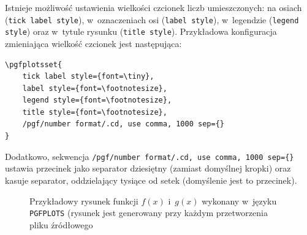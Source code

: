 Istnieje możliwość ustawienia wielkości czcionek liczb umieszczonych: na osiach (\verb+tick label style+), w~oznaczeniach osi (\verb+label style+), w~legendzie (\verb+legend style+) oraz w~tytule rysunku (\verb+title style+). Przykładowa konfiguracja zmieniająca wielkość czcionek jest następująca:
\begin{lstlisting}[style=customlatex,frame=single]
\pgfplotsset{
	tick label style={font=\tiny},
	label style={font=\footnotesize},
	legend style={font=\footnotesize},
	title style={font=\footnotesize},
	/pgf/number format/.cd, use comma, 1000 sep={}
}
\end{lstlisting}
Dodatkowo, sekwencja \verb+/pgf/number format/.cd, use comma, 1000 sep={}+ ustawia przecinek jako separator dziesiętny (zamiast domyślnej kropki) oraz kasuje separator, oddzielający tysiące od setek (domyślenie jest to przecinek).

\newcommand{\szer}{8cm}
\newcommand{\wys}{7cm}

\begin{figure}[tb]
\centering
{}
\caption{Przykładowy rysunek funkcji $f(x)$ i~$g(x)$ wykonany w~języku \texttt{PGFPLOTS} (rysunek jest generowany przy każdym przetworzenia pliku źródłowego}
\label{r_pgfplots_funkcje}
\end{figure}

